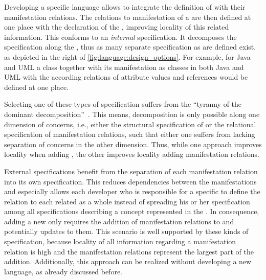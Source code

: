 Developing a specific language allows to integrate the definition of \commonalities with their manifestation relations.
The relations to manifestation of a \commonality are then defined at one place with the declaration of the \commonality, improving locality of this related information.
This conforms to an \emph{internal} specification.
It decomposes the specification along the \commonalities, thus as many separate specification as \commonalities are defined exist, as depicted in the right of \autoref{fig:language:design_options}.
For example, for Java and \gls{UML} a class \commonality together with its manifestation as classes in both Java and \gls{UML} with the according relations of attribute values and references would be defined at one place.

Selecting one of these types of specification suffers from the \enquote{tyranny of the dominant decomposition}~\cite{tarr1999Tyranny-ICSE}.
This means, decomposition is only possible along one dimension of concerns, i.e., either the structural specification of \commonalities or the relational specification of manifestation relations, such that either one suffers from lacking separation of concerns in the other dimension.
Thus, while one approach improves locality when adding \commonalities, the other improves locality adding manifestation relations.

External specifications benefit from the separation of each manifestation relation into its own specification.
This reduces dependencies between the manifestations and especially allows each developer who is responsible for a specific \concretemetamodel to define the relation to each related \conceptmetamodel as a whole instead of spreading his or her specification among all \commonalities specifications describing a concept represented in the \concretemetamodel.
In consequence, adding a new \concretemetamodel only requires the addition of manifestation relations to \conceptmetamodels and potentially updates to them.
This scenario is well supported by these kinds of specification, because locality of all information regarding a manifestation relation is high and the manifestation relations represent the largest part of the addition.
Additionally, this approach can be realized without developing a new language, as already discussed before.

